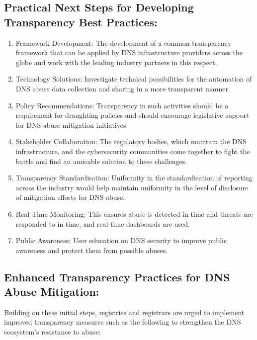 \subsection{Practical Next Steps for Developing Transparency Best Practices: }

\begin{enumerate}
    \item Framework Development: The development of a common transparency framework that can be applied by DNS infrastructure providers across the globe and work with the leading industry partners in this respect.

    \item Technology Solutions: Investigate technical possibilities for the automation of DNS abuse data collection and sharing in a more transparent manner.

    \item Policy Recommendations: Transparency in such activities should be a requirement for draughting policies and should encourage legislative support for DNS abuse mitigation initiatives.
    
    \item Stakeholder Collaboration: The regulatory bodies, which maintain the DNS infrastructure, and the cybersecurity communities come together to fight the battle and find an amicable solution to these challenges.
    
    \item Transparency Standardisation: Uniformity in the standardisation of reporting across the industry would help maintain uniformity in the level of disclosure of mitigation efforts for DNS abuse.
    
    \item Real-Time Monitoring: This ensures abuse is detected in time and threats are responded to in time, and real-time dashboards are used.
    
    \item  Public Awareness: User education on DNS security to improve public awareness and protect them from possible abuses.
\end{enumerate}


\subsection{Enhanced Transparency Practices for DNS Abuse Mitigation: }

Building on these initial steps, registries and registrars are urged to implement improved transparency measures such as the following to strengthen the DNS ecosystem's resistance to abuse:


